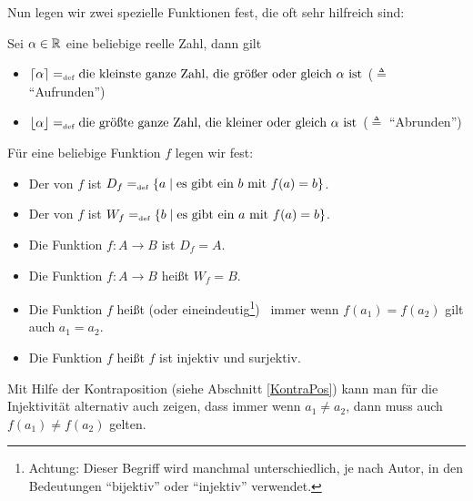 \bigskip

\noindent Nun legen wir zwei spezielle Funktionen fest, die oft sehr
hilfreich sind:
\begin{definition}
\label{floorceil}
Sei $\alpha \in \mathbb R$ eine beliebige reelle Zahl, dann gilt
\begin{itemize}
%
\item $\lceil \alpha \rceil =_{\mathrm{\scriptscriptstyle def}} \text{die kleinste ganze Zahl, die größer
oder gleich $\alpha$ ist}$ ($\triangleq$ "`Aufrunden"') \index{$\lceil \cdot \rceil$}
%
\item $\lfloor \alpha \rfloor =_{\mathrm{\scriptscriptstyle def}} \text{die größte ganze Zahl, die kleiner
oder gleich $\alpha$ ist}$ ($\triangleq$ "`Abrunden"') \index{$\lfloor \cdot \rfloor$}
%
\end{itemize}
\end{definition}

\begin{definition}
Für eine beliebige Funktion $f$ legen wir fest:
\begin{itemize}
%
\item Der  von $f$ ist $D_f =_{\mathrm{\scriptscriptstyle def}}
\{a \mid \text{es gibt ein $b$ mit $f(a) = b$}\}$.
%
\item Der  von $f$ ist $W_f =_{\mathrm{\scriptscriptstyle def}}
\{b \mid \text{es gibt ein $a$ mit $f(a) = b$}\}$.
%
\item Die Funktion $f \colon A \rightarrow B$ ist  \gdw $D_f
= A$.
% 
\item Die Funktion $f \colon A \rightarrow B$ heißt  \gdw $W_f = B$.
%
\item Die Funktion $f$ heißt  (oder
eineindeutig\footnote{Achtung: Dieser Begriff wird manchmal
unterschiedlich, je nach Autor, in den Bedeutungen "`bijektiv"' oder
"`injektiv"' verwendet.}) \gdw\ immer wenn $f(a_1)\allowbreak =
f(a_2)$ gilt auch $a_1 = a_2$.
%
\item Die Funktion $f$ heißt  \gdw $f$ ist injektiv und surjektiv.
\end{itemize}
\end{definition}
Mit Hilfe der Kontraposition (siehe Abschnitt \ref{KontraPos}) kann
man für die Injektivität alternativ auch zeigen, dass immer wenn
$a_1 \not= a_2$, dann muss auch $f(a_1) \not= f(a_2)$ gelten.

